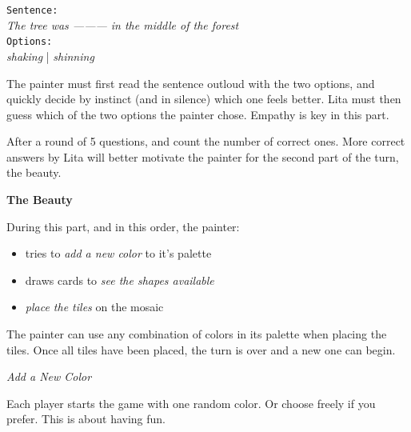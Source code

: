\documentclass[twocolumn]{article}
\newcommand{\lvl}[1]{\vspace{0.5cm}\Large{\textbf{#1}}\vspace{0.2cm}}
\newcommand{\sublvl}[1]{\vspace{0.3cm}\large{\textit{#1}}\vspace{0.1cm}}
\begin{document}
\begin{centering}
\texttt{Sentence:}\\
\textit{The tree was --------- in the middle of the forest}\\
\texttt{Options:}\\
\textit{shaking} | \textit{shinning}\\
\end{centering}
\vspace{0.5cm}

The painter must first read the sentence outloud with the two options, and quickly decide by instinct (and in silence) which one feels better. Lita must then guess which of the two options the painter chose. Empathy is key in this part.

After a round of 5 questions, and count the number of correct ones. More correct answers by Lita will better motivate the painter for the second part of the turn, the beauty. 


\lvl{The Beauty}

During this part, and in this order, the painter:
\begin{itemize}
 \item tries to \textit{add a new color} to it's palette
 \item draws cards to \textit{see the shapes available}
 \item \textit{place the tiles} on the mosaic
\end{itemize}

The painter can use any combination of colors in its palette when placing the tiles. Once all tiles have been placed, the turn is over and a new one can begin.

\sublvl{Add a New Color}

Each player starts the game with one random color. Or choose freely if you prefer. This is about having fun.
\end{document}
